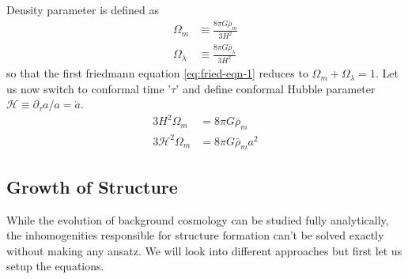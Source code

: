 \documentclass[12pt,twocolumn]{article}
\begin{document}
Density parameter is defined as
\begin{align}
\Omega_{m} &\equiv \frac{8 \pi G \bar{\rho}_{m}}{3 H^2}\\
\Omega_{\lambda} &\equiv \frac{8 \pi G \bar{\rho}_{\lambda}}{3 H^2}
\end{align}
%
so that the first friedmann equation \ref{eq:fried-eqn-1} reduces to $\Omega_{m} + \Omega_{\lambda} = 1$. Let us now switch to conformal time '$\tau$' and define conformal Hubble parameter $\mathcal{H} \equiv \partial_\tau a / a = \dot{a}$. 
\begin{align}
3 H^2 \Omega_{m} &= 8 \pi G \bar{\rho}_{m}\\
3 \mathcal{H}^2 \Omega_{m} &= 8 \pi G \bar{\rho}_{m} a^2
\end{align}

\subsection{Growth of Structure}
While the evolution of background cosmology can be studied fully analytically, the inhomogenities responsible for structure formation can't be solved exactly without making any ansatz. We will look into different approaches but first let us setup the equations.
\end{document}
